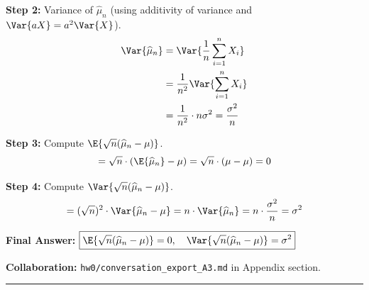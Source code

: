 \documentclass{article}
\begin{document}
\begin{aprob}
    \textbf{Step 2:} Variance of $\widehat{\mu}_n$ (using additivity of variance and $\Var{aX} = a^2\Var{X}$).
    \begin{align*}
        \Var{\widehat{\mu}_n} &= \Var{\frac{1}{n} \sum_{i=1}^n X_i} \\
        &= \frac{1}{n^2} \Var{\sum_{i=1}^n X_i} \\
        &= \frac{1}{n^2} \cdot n\sigma^2 = \frac{\sigma^2}{n}
    \end{align*}

    \textbf{Step 3:} Compute $\E{\sqrt{n}(\widehat{\mu}_n - \mu)}$.
    \[
        = \sqrt{n} \cdot (\E{\widehat{\mu}_n} - \mu) = \sqrt{n} \cdot (\mu - \mu) = 0
    \]

    \textbf{Step 4:} Compute $\Var{\sqrt{n}(\widehat{\mu}_n - \mu)}$.
    \[
        = (\sqrt{n})^2 \cdot \Var{\widehat{\mu}_n - \mu} = n \cdot \Var{\widehat{\mu}_n} = n \cdot \frac{\sigma^2}{n} = \sigma^2
    \]

    \medskip
    \textbf{Final Answer:} $\boxed{\E{\sqrt{n}(\widehat{\mu}_n - \mu)} = 0, \quad \Var{\sqrt{n}(\widehat{\mu}_n - \mu)} = \sigma^2}$

    \medskip
    \textbf{Collaboration:} \texttt{hw0/conversation\_export\_A3.md} in Appendix section.

\end{aprob}

\noindent\rule{\textwidth}{0.4pt}

\clearpage{}
\end{document}
